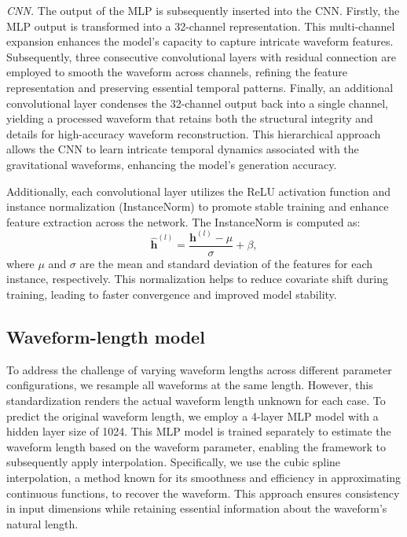 \documentclass[
reprint,
superscriptaddress,
amsmath,amssymb,
aps,
prd,
floatfix,
]{revtex4-2}
\begin{document}
\textit{CNN.\textemdash} The output of the MLP is subsequently inserted into the CNN.
Firstly, the MLP output is transformed into a 32-channel representation. 
This multi-channel expansion enhances the model's capacity to capture intricate waveform features. 
Subsequently, three consecutive convolutional layers with residual connection are employed to smooth the waveform across channels, refining the feature representation and preserving essential temporal patterns. 
Finally, an additional convolutional layer condenses the 32-channel output back into a single channel, yielding a processed waveform that retains both the structural integrity and details for high-accuracy waveform reconstruction.
This hierarchical approach allows the CNN to learn intricate temporal dynamics associated with the gravitational waveforms, enhancing the model's generation accuracy.

Additionally, each convolutional layer utilizes the ReLU activation function and instance normalization (InstanceNorm) to promote stable training and enhance feature extraction across the network.
The InstanceNorm \cite{ulyanovInstanceNormalizationMissing2017} is computed as:
\begin{equation}
    \hat{\mathbf{h}}^{(l)} = \frac{\mathbf{h}^{(l)} - \mu}{\sigma} + \beta,
\end{equation}
where $\mu$ and $\sigma$ are the mean and standard deviation of the features for each instance, respectively. 
This normalization helps to reduce covariate shift during training, leading to faster convergence and improved model stability.

\subsection{Waveform-length model}
To address the challenge of varying waveform lengths across different parameter configurations, we resample all waveforms at the same length. 
However, this standardization renders the actual waveform length unknown for each case. To predict the original waveform length, we employ a 4-layer MLP model with a hidden layer size of 1024. 
This MLP model is trained separately to estimate the waveform length based on the waveform parameter, enabling the framework to subsequently apply interpolation. 
Specifically, we use the cubic spline interpolation, a method known for its smoothness and efficiency in approximating continuous functions, to recover the waveform.
This approach ensures consistency in input dimensions while retaining essential information about the waveform’s natural length. %
\end{document}
